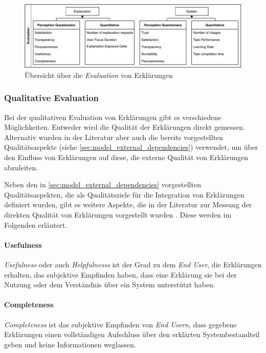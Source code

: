 \begin{figure}[htb!]
    \begin{center}
        \includegraphics[width=\textwidth]{contents/05_model_description/res/model_evaluation_overview.pdf}
    \end{center}
    \caption{Übersicht über die \textit{Evaluation} von Erklärungen}
    \label{fig:model_evaluation_overview}
\end{figure}

\subsubsection{Qualitative Evaluation}

Bei der qualitativen Evaluation von Erklärungen gibt es verschiedene Möglichkeiten. Entweder wird die Qualität der Erklärungen direkt gemessen. Alternativ wurden in der Literatur aber auch die bereits vorgestellten Qualitätsaspekte (siehe \autoref{sec:model_external_dependencies}) verwendet, um über den Einfluss von Erklärungen auf diese, die externe Qualität von Erklärungen abzuleiten.

Neben den in \autoref{sec:model_external_dependencies} vorgestellten Qualitätsaspekten, die als Qualitätsziele für die Integration von Erklärungen definiert wurden, gibt es weitere Aspekte, die in der Literatur zur Messung der direkten Qualität von Erklärungen vorgestellt wurden \cite{sato_action-triggering_2019}. Diese werden im Folgenden erläutert.

\paragraph{Usefulness} \textit{Usefulness} oder auch \textit{Helpfulnesss} ist der Grad zu dem \textit{End User}, die Erklärungen erhalten, das subjektive Empfinden haben, dass eine Erklärung sie bei der Nutzung oder dem Verständnis über ein System unterstützt haben. 

\paragraph{Completeness} \textit{Completeness} ist das subjektive Empfinden von \textit{End Usern}, dass gegebene Erklärungen einen vollständigen Aufschluss über den erklärten Systembestandteil geben und keine Informationen weglassen.

